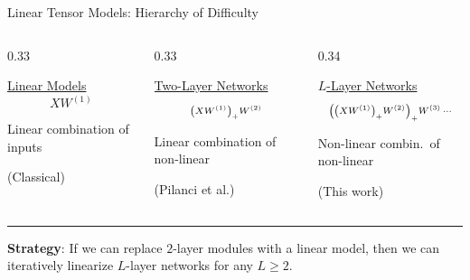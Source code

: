 \documentclass[usenames,dvipsnames,notheorems]{beamer}
\newcommand{\horizontalrule}{
	{
			\vspace{-0.5em}
			\center \rule{\textwidth}{0.1em}
			\vspace{-0.2em}
		}
}
\newcommand{\bad}[1]{\textcolor{bad}{#1}}
\newcommand{\good}[1]{\textcolor{good}{#1}}
\begin{document}
\begin{frame}{Linear Tensor Models: Hierarchy of Difficulty}

	\vspace{-2ex}
	\begin{center}
		
	\end{center}
	\pause

	\vspace{-2ex}
	\begin{columns}[c]
		\begin{column}{0.33\textwidth}
			\begin{center}
				\underline{Linear Models}
				\[
					{\scriptstyle X W^{(1)} }
				\]

				\good{Linear} combination of inputs\\
				\vspace{0.5ex}

				(Classical)
			\end{center}
		\end{column}
		\pause
		\begin{column}{0.33\textwidth}
			\begin{center}
				\underline{Two-Layer Networks}
				\[
					{\scriptstyle \left(X W^{(1)}\right)_+ W^{(2)}}
				\]

				\good{Linear} combination of \bad{non-linear}\\
				\vspace{0.5ex}

				(Pilanci et al.)
			\end{center}
		\end{column}
		\pause
		\begin{column}{0.34\textwidth}
			\begin{center}
				\underline{\( L \)-Layer Networks}
				\[
					{\scriptstyle \left(\left(X W^{(1)}\right)_+ W^{(2)}\right)_+ W^{(3)} \, \cdots }
				\]

				\bad{Non-linear} combin.\ of \bad{non-linear}\\
				\vspace{0.5ex}

				(This work)
			\end{center}
		\end{column}
	\end{columns}

	\pause
	\vspace{2ex}
	\horizontalrule
	\vspace{1ex}

	\textbf{Strategy}: If we can replace \( 2 \)-layer modules with a linear
	model, then we can iteratively linearize \good{\( L \)-layer} networks for any \( L \geq 2 \).

\end{frame}
\end{document}
